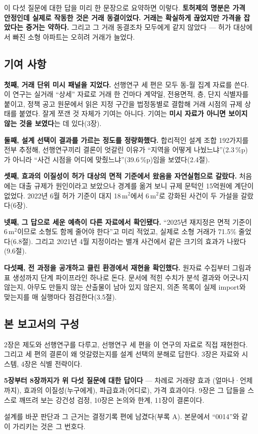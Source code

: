 이 다섯 질문에 대한 답을 미리 한 문장으로 요약하면 이렇다.
\textbf{토허제의 명분은 가격 안정인데 실제로 작동한 것은 거래 동결이었다. 거래는
확실하게 끊었지만 가격을 잡았다는 증거는 약하다.} 그리고 그 거래 동결조차
모두에게 같지 않았다 --- 허가 대상에서 빠진 소형 아파트는 오히려 거래가 늘었다.

\subsection{기여 사항}

\textbf{첫째, 거래 단위 미시 패널을 지었다.} 선행연구 세 편은 모두 동-월 집계
자료를 쓴다. 이 연구는 실거래 ``상세'' 자료로 거래 한 건마다 계약일, 전용면적,
층, 단지 식별자를 붙이고, 정책 공고 원문에서 읽은 지정 구간을 법정동별로 결합해
거래 시점의 규제 상태를 붙였다. 잘게 쪼갠 것 자체가 기여는 아니다. 기여는
\textbf{미시 자료가 아니면 보이지 않는 것을 보였다}는 데 있다(3장).

\textbf{둘째, 설계 선택이 결과를 가르는 정도를 정량화했다.} 합리적인 설계 조합
192가지를 전부 추정해, 선행연구끼리 결론이 엇갈린 이유가 ``지역을 어떻게
나눴느냐''(2.3\,\%p)가 아니라 ``사건 시점을 어디에 맞췄느냐''(39.6\,\%p)임을
보였다(2.4절).

\textbf{셋째, 효과의 이질성이 허가 대상의 면적 기준에서 왔음을 자연실험으로
갈랐다.} 처음에는 대출 규제가 원인이라고 보았으나 경계를 옮겨 보니 규제 문턱인
15억원에 계단이 없었다. 2022년 6월 허가 기준이 대지 18\,m$^2$에서 6\,m$^2$로
강화된 사건이 두 가설을 갈랐다(6장).

\textbf{넷째, 그 답으로 세운 예측이 다른 자료에서 확인됐다.} ``2025년 재지정은
면적 기준이 6\,m$^2$이므로 소형도 함께 줄어야 한다''고 미리 적었고, 실제로 소형
거래가 71.5\% 줄었다(6.8절). 그리고 2021년 4월 지정이라는 별개 사건에서 같은
크기의 효과가 나왔다(9.6절).

\textbf{다섯째, 전 과정을 공개하고 클린 환경에서 재현을 확인했다.} 원자료 수집부터
그림과 표 생성까지 \pipeSteps 단계 파이프라인 하나로 돈다. 문서에 적힌 수치가 분석 결과와
어긋나지 않는지, 아무도 만들지 않는 산출물이 남아 있지 않은지, 의존 목록이 실제
import와 맞는지를 매 실행마다 점검한다(3.5절).

\subsection{본 보고서의 구성}

2장은 제도와 선행연구를 다루고, 선행연구 세 편을 이 연구의 자료로 직접 재현한다.
그리고 세 편의 결론이 왜 엇갈렸는지를 설계 선택의 분해로 답한다. 3장은 자료와
시스템, 4장은 식별 전략이다.

\textbf{5장부터 8장까지가 위 다섯 질문에 대한 답이다} --- 차례로 거래량 효과
(얼마나·언제까지), 효과의 이질성(누구에게), 파급효과(어디로), 가격 효과이다.
9장은 그 답들을 스스로 깨뜨려 보는 강건성 검정, 10장은 논의와 한계,
11장이 결론이다.

설계를 바꾼 판단과 그 근거는 결정기록 \pipeDecisions 편에 남겼다(부록 A). 본문에서 ``0014''와
같이 가리키는 것은 그 번호다.
